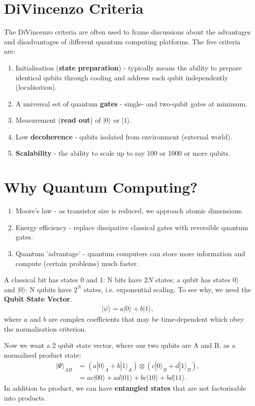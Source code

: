 \documentclass[lasers.tex]{subfiles}
\begin{document}
\section{DiVincenzo Criteria}
The DiVincenzo criteria are often used to frame discussions about the advantages and disadvantages of different quantum computing platforms. 
The five criteria are:
\begin{enumerate}
    \item Initialisation (\textbf{state preparation}) - typically means the ability to prepare identical qubits through cooling and address each qubit independently (localisation).
    \item A universal set of quantum \textbf{gates} - single- and two-qubit gates at minimum. 
    \item Measurement (\textbf{read out}) of $|0\rangle$ or $|1\rangle$.
    \item Low \textbf{decoherence} - qubits isolated from environment (external world).
    \item \textbf{Scalability} - the ability to scale up to say 100 or 1000 or more qubits.
\end{enumerate}

\section{Why Quantum Computing?}
\begin{enumerate}
    \item Moore's law - as transistor size is reduced, we approach atomic dimensions.  
    \item Energy efficiency - replace dissipative classical gates with reversible quantum gates.
    \item Quantum 'advantage' - quantum computers can store more information and compute (certain problems) much faster.
\end{enumerate}
A classical bit has states 0 and 1: N bits have $2N$ states; a qubit has states $0\rangle$ and $|0\rangle$: N qubits have $2^N$ states, i.e. exponential scaling. 
To see why, we need the \textbf{Qubit State Vector}.
\begin{align}
    |\psi\rangle = a|0\rangle + b|1\rangle,
\end{align}
where $a$ and $b$ are complex coefficients that may be time-dependent which obey the normalisation criterion. 

Now we want a 2 qubit state vector, where our two qubits are A and B, as a normalised product state:
\begin{align}
    |\Psi\rangle_{AB} &= (a|0\rangle_A + b|1\rangle_A)\otimes(c|0\rangle_B+d|1\rangle_B), \\
                      &= ac|00\rangle + ad|01\rangle + bc|10\rangle + bd|11\rangle.
\end{align}
In addition to product, we can have \textbf{entangled states} that are not factorisable into products.
\end{document}
